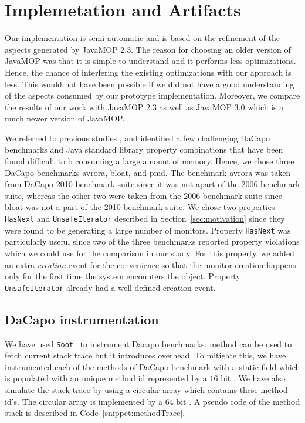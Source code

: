 \section{Implemetation and Artifacts}
\label{sec:implementation}

Our implementation is semi-automatic and is based on the refinement of the 
aspects generated by JavaMOP 2.3. The reason for choosing an older version of 
JavaMOP was that it is simple to understand and it performs less optimizations. 
Hence, the chance of interfering the existing optimizations with our approach is 
less. This would not have been possible if we did not have a good understanding 
of the aspects consumed by our prototype implementation. Moreover, we compare 
the results of our work with JavaMOP 2.3 as well as JavaMOP 3.0 which is a much 
newer version of JavaMOP. 

We referred to previous studies \cite{}, and identified a few challenging DaCapo 
benchmarks and Java standard library property combinations that have been found 
difficult to b consuming a large amount of memory. Hence, we chose three DaCapo 
benchmarks \textsf{avrora}, \textsf{bloat}, and \textsf{pmd}. The benchmark 
\textsf{avrora} was taken from DaCapo 2010 benchmark suite since it was not 
apart of the 2006 benchmark suite, whereas the other two were taken from the 
2006 benchmark suite since \textsf{bloat} was not a part of the 2010 benchmark 
suite. We chose two properties \texttt{HasNext} and \texttt{UnsafeIterator} 
described in Section~\ref{sec:motivation} since they were found to be generating 
a large number of monitors. Property \texttt{HasNext} was particularly useful 
since two of the three benchmarks reported property violations which we could 
use for the comparison in our study. For this property, we added an extra 
\textit{creation} event for the convenience so that the monitor creation happens 
only  for the first time the system encounters the object. Property 
\texttt{UnsafeIterator} already had a well-defined creation event.


\subsection{DaCapo instrumentation} 
\label{subsec:dacapoInstr}

We have used \texttt{Soot}~\cite{soot} to
instrument Dacapo benchmarks.  method can be used to
fetch current stack trace but it introduces overhead. To mitigate this, we have
instrumented each of the methods of DaCapo benchmark with a static
 field which is populated with an unique method id represented by
a $16$ bit . We have also simulate the stack trace by using a
circular array which contains these method id's. The circular array is
implemented by a $64$ bit . A pseudo code of the method stack is
described in Code~\ref{snippet:methodTrace}.

